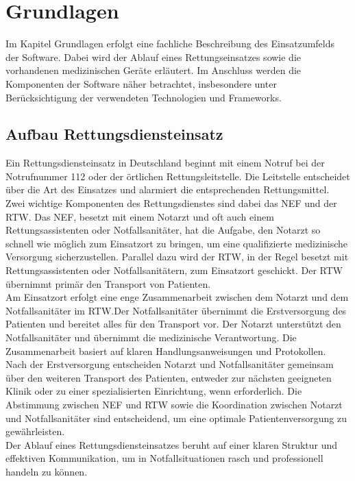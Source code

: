 \chapter{Grundlagen} 
Im Kapitel Grundlagen erfolgt eine fachliche Beschreibung 
des Einsatzumfelds der Software. Dabei wird der Ablauf eines 
Rettungseinsatzes sowie die vorhandenen medizinischen Geräte erläutert. 
Im Anschluss werden die Komponenten der Software näher betrachtet, insbesondere
unter Berücksichtigung der verwendeten Technologien und Frameworks.

\section{Aufbau Rettungsdiensteinsatz}
Ein Rettungsdiensteinsatz in Deutschland beginnt mit einem Notruf bei der
Notrufnummer 112 oder der örtlichen Rettungsleitstelle. Die Leitstelle
entscheidet über die Art des Einsatzes und alarmiert die entsprechenden
Rettungsmittel. Zwei wichtige Komponenten des Rettungsdienstes sind dabei
das \ac{NEF} und der \ac{RTW}.
Das \ac{NEF}, besetzt mit einem Notarzt und oft auch einem Rettungsassistenten
oder Notfallsanitäter, hat die Aufgabe, den Notarzt so schnell wie möglich
zum Einsatzort zu bringen, um eine qualifizierte medizinische Versorgung
sicherzustellen. Parallel dazu wird der \ac{RTW}, in der Regel besetzt mit
Rettungsassistenten oder Notfallsanitätern, zum Einsatzort geschickt.
Der RTW übernimmt primär den Transport von Patienten. \\

Am Einsatzort erfolgt eine enge Zusammenarbeit zwischen dem Notarzt
und dem Notfallsanitäter im \ac{RTW}.Der Notfallsanitäter übernimmt die 
Erstversorgung des Patienten und bereitet alles für den Transport vor.
Der Notarzt unterstützt den Notfallsanitäter und übernimmt die
medizinische Verantwortung. Die Zusammenarbeit basiert auf klaren
Handlungsanweisungen und Protokollen. \\

Nach der Erstversorgung entscheiden Notarzt und Notfallsanitäter
gemeinsam über den weiteren Transport des Patienten, entweder zur nächsten
geeigneten Klinik oder zu einer spezialisierten Einrichtung, wenn erforderlich.
Die Abstimmung zwischen \ac{NEF} und \ac{RTW} sowie die Koordination zwischen Notarzt
und Notfallsanitäter sind entscheidend, um eine optimale Patientenversorgung
zu gewährleisten.\\

Der Ablauf eines Rettungsdiensteinsatzes beruht auf einer klaren Struktur
und effektiven Kommunikation, um in Notfallsituationen rasch und professionell
handeln zu können.\\

